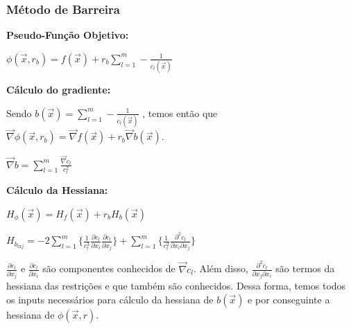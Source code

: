 \documentclass[10pt, a4paper]{article}
\begin{document}
\subsubsection{Método de Barreira}

\textbf{Pseudo-Função Objetivo:}

\vspace{3mm}
$\phi(\overrightarrow{x}, r_b) = f(\overrightarrow{x}) + 
r_b \sum_{l=1}^{m} -\frac{1}{c_l(\overrightarrow{x})}$

\vspace{5mm}
\textbf{Cálculo do gradiente:}

\vspace{3mm}
Sendo $b(\overrightarrow{x}) = \sum_{l=1}^{m} -\frac{1}{c_l(\overrightarrow{x})}$
, temos então que
$\overrightarrow{\nabla} \phi(\overrightarrow{x}, r_b) = 
\overrightarrow{\nabla} f(\overrightarrow{x}) + 
r_b \overrightarrow{\nabla} b(\overrightarrow{x})$.

\vspace{3mm}
$\overrightarrow{\nabla} b =
\sum_{l=1}^{m} \frac{\overrightarrow{\nabla} c_l}{c_l^2}$

\vspace{5mm}
\textbf{Cálculo da Hessiana:}

\vspace{3mm}
$H_{\phi}(\overrightarrow{x}) = H_f(\overrightarrow{x}) 
+ r_b H_b(\overrightarrow{x})$

\vspace{3mm}
$H_{b_{i\text{x}j}} = -2 \sum_{l=1}^{m} \{ \frac{1}{c_l^3}\frac{\partial c_l}{\partial x_i} \frac{\partial c_l}{\partial x_j} \}
+ \sum_{l=1}^{m} \{ \frac{1}{c_l^2} \frac{\partial ^2 c_l}{\partial x_i \partial x_j}            \}$

\vspace{3mm}
$\frac{\partial c_l}{\partial x_j}$ e
$\frac{\partial c_l}{\partial x_i}$ são componentes conhecidos de $\overrightarrow{\nabla} c_l$.
Além disso,
$\frac{\partial^2 c_l}{\partial x_j \partial x_i}$ são termos da hessiana das restrições e que também são conhecidos.
Dessa forma, temos todos os inputs necessários para cálculo da hessiana de 
$b(\overrightarrow{x})$ e por conseguinte a hessiana de 
$\phi(\overrightarrow{x}, r)$.
\end{document}
